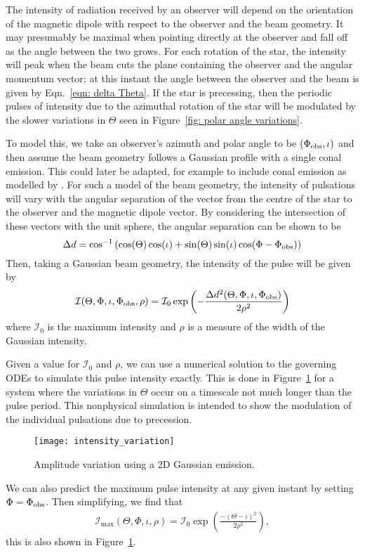 \documentclass[../full_thesis/full_thesis.tex]{subfiles}
\begin{document}
The intensity of radiation received by an observer will depend on the
orientation of the magnetic dipole with respect to the observer and the beam
geometry. It may presumably be maximal when pointing directly at the observer
and fall off as the angle between the two grows. For each rotation of the star,
the intensity will peak when the beam cuts the plane containing the observer
and the angular momentum vector; at this instant the angle between the
observer and the beam is given by Eqn.~\eqref{eqn: delta Theta}. If the star is
precessing, then the periodic pulses of intensity due to the azimuthal rotation
of the star will be modulated by the slower variations in $\Theta$ seen in
Figure~\ref{fig: polar angle variations}.

To model this, we take an observer's azimuth and polar angle to be $(\Phi_{\mathrm{obs}},
\iota)$ and then assume the beam geometry follows a Gaussian profile with a
single conal emission.  This could later be adapted, for example to include
conal emission as modelled by \citet{Akgun2006}.  For such a model of the beam
geometry, the intensity of pulsations will vary with the angular separation of
the vector from the centre of the star to the observer and the magnetic dipole
vector. By considering the intersection of these vectors with the unit sphere,
the angular separation can be shown to be
\begin{equation}
\Delta d = \cos^{-1}\left(\cos(\Theta)\cos(\iota) +
                             \sin(\Theta)\sin(\iota)\cos(\Phi - \Phi_{\mathrm{obs}})\right)
\label{eqn: angular sep inv cos}
\end{equation}
Then, taking a Gaussian beam geometry, the intensity of the pulse will be given by
\begin{equation}
\mathcal{I}(\Theta, \Phi, \iota, \Phi_{\mathrm{obs}}, \rho) =
\mathcal{I}_{0} \exp\left(-\frac{\Delta d^{2}(\Theta, \Phi, \iota, \Phi_{\mathrm{obs}})}{2\rho^{2}}\right)
\label{eqn: Gaussian beam intensity}
\end{equation}
where $\mathcal{I}_{0}$ is the maximum intensity and $\rho$ is a measure of the
width of the Gaussian intensity.

Given a value for $\mathcal{I}_0$ and $\rho$, we can use a numerical solution to the
governing ODEs to simulate this pulse intensity exactly. This is done in
Figure~\ref{fig: intensity variation} for a system where the variations in
$\Theta$ occur on a timescale not much longer than the pulse period. This
nonphysical simulation is intended to show the modulation of the individual
pulsations due to precession.
\begin{figure}[htb]
\centering
\texttt{[image: intensity\_variation]}
\caption{Amplitude variation using a 2D Gaussian emission.}
\label{fig: intensity variation}
\end{figure}
We can also predict the maximum pulse intensity at any given instant by setting
$\Phi=\Phi_{\mathrm{obs}}$. Then simplifying, we find that
\begin{align}
\mathcal{I}_{\mathrm{max}}(\Theta, \Phi, \iota, \rho) =
\mathcal{I}_{0}\exp\left(\frac{-(\Theta-\iota)^{2}}{2\rho^{2}}\right),
\label{eqn: A max}
\end{align}
this is also shown in Figure~\ref{fig: intensity variation}.
\end{document}
